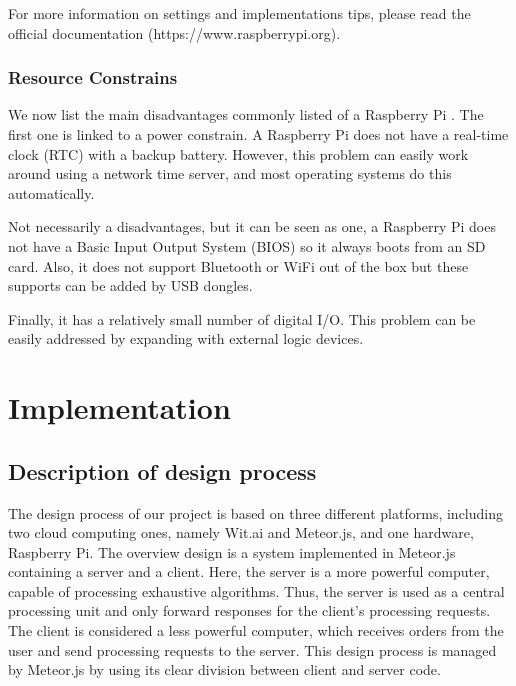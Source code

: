 For more information on settings and implementations tips, please read the official documentation (https://www.raspberrypi.org).

\subsubsection{Resource Constrains}

We now list the main disadvantages commonly listed of a Raspberry Pi \cite{vujovic2014raspberry}.
The first one is linked to a power constrain.
A Raspberry Pi does not have a real-time clock (RTC) with a backup battery.
However, this problem can easily work around using a network time server, and most operating systems do this automatically.

Not necessarily a disadvantages, but it can be seen as one, a Raspberry Pi does not have a Basic Input Output System (BIOS) so it always boots from an SD card.
Also, it does not support Bluetooth or WiFi out of the box but these supports can be added by USB dongles.

Finally, it has a relatively small number of digital I/O.
This problem can be easily addressed by expanding with external logic devices.

\section{Implementation}



\subsection{Description of design process}

The design process of our project is based on three different platforms, including two cloud computing ones, namely Wit.ai and Meteor.js, and one hardware, Raspberry Pi.
The overview design is a system implemented in Meteor.js containing a server and a client.
Here, the server is a more powerful computer, capable of processing exhaustive algorithms.
Thus, the server is used as a central processing unit and only forward responses for the client's processing requests.
The client is considered a less powerful computer, which receives orders from the user and send processing requests to the server.
This design process is managed by Meteor.js by using its clear division between client and server code.

